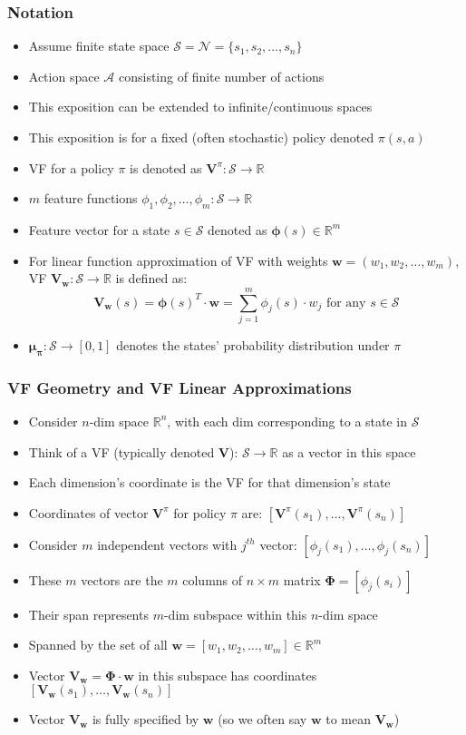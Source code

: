 \documentclass[handout]{beamer}
\newcommand{\vw}{\bm{V_w}}
\newcommand{\vpi}{\bm{V}^{\pi}}
\newcommand{\bphi}{\bm{\Phi}}
\newcommand{\bmu}{\bm{\mu_{\pi}}}
\newcommand{\bv}{\bm{V}}
\newcommand{\bw}{\bm{w}}
\begin{document}
\begin{frame}
\frametitle{Notation}
\pause
\begin{itemize}[<+->]
\item Assume finite state space $\mathcal{S} = \mathcal{N} = \{s_1, s_2, \ldots, s_n\}$
\item Action space $\mathcal{A}$ consisting of finite number of actions
\item This exposition can be extended to infinite/continuous spaces
\item This exposition is for a fixed (often stochastic) policy denoted $\pi(s,a)$
\item VF for a policy $\pi$ is denoted as $\vpi: \mathcal{S} \rightarrow \mathbb{R}$
\item $m$ feature functions $\phi_1, \phi_2, \ldots, \phi_m : \mathcal{S} \rightarrow \mathbb{R}$
\item Feature vector for a state $s \in \mathcal{S}$ denoted as $\bm{\phi}(s) \in \mathbb{R}^m$
\item For linear function approximation of VF with weights $\bw = (w_1, w_2, \ldots, w_m)$,
VF $\vw: \mathcal{S} \rightarrow \mathbb{R}$ is defined as:
$$\vw(s) = \bm{\phi}(s)^T \cdot \bw =  \sum_{j=1}^m \phi_j(s) \cdot w_j \mbox{ for any } s \in \mathcal{S}$$
\item $\bmu : \mathcal{S} \rightarrow [0, 1]$ denotes the states' probability distribution under $\pi$ 
\end{itemize}
\end{frame}


\begin{frame}
\frametitle{VF Geometry and VF Linear Approximations}
\pause
\begin{itemize}[<+->]
\item Consider $n$-dim space $\mathbb{R}^n$, with each dim corresponding to a state in $\mathcal{S}$
\item Think of a VF (typically denoted $\bv$): $\mathcal{S} \rightarrow \mathbb{R}$ as a vector in this space
\item Each dimension's coordinate is the VF for that dimension's state
\item Coordinates of vector $\vpi$ for policy $\pi$ are: $[\vpi(s_1), \ldots, \vpi(s_n)]$
\item Consider $m$ independent vectors with $j^{th}$ vector: $[\phi_j(s_1), \ldots, \phi_j(s_n)]$
\item These $m$ vectors are the $m$ columns of $n \times m$ matrix $\bphi = [\phi_j(s_i)]$
\item Their span represents $m$-dim subspace within this $n$-dim space
\item Spanned by the set of all $\bw = [w_1, w_2, \ldots, w_m] \in \mathbb{R}^m$
\item Vector $\vw = \bphi \cdot \bw$ in this subspace has coordinates $[\vw(s_1), \ldots , \vw(s_n)]$
\item Vector $\vw$ is fully specified by $\bw$ (so we often say $\bw$ to mean $\vw$)
\end{itemize}
\end{frame}
\end{document}
